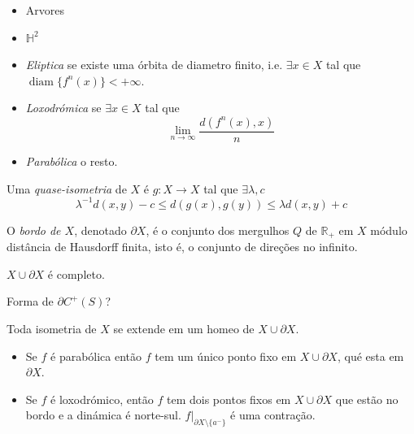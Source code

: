 \medskip{}

\begin{example}
\label{example-gh-hyperbolic}
\begin{itemize}
\item Arvores
\item $\mathbb{H}^2$
\end{itemize}
\end{example}

\medskip{}
\begin{itemize}
\item \textit{Eliptica} se existe uma órbita
de diametro finito, i.e. $\exists x \in X$
tal que
$\operatorname{diam}\{f^n(x)\}<+\infty$.
\item \textit{Loxodrómica} se
$\exists x \in X$ tal que
$$
\lim_{n \to \infty}
\frac{d(f^n(x),x)}{n}
$$
\item \textit{Parabólica} o resto.
\end{itemize}

\begin{definition}
\label{definition-gh-quasi-isometry}
Uma \textit{quase-isometria} de $X$ é
$g:X\to X$ tal que $\exists \lambda,c$
$$
\lambda^{-1}d(x,y)-c\leq d(g(x),g(y))
\leq \lambda d(x,y)+c
$$
\end{definition}

\medskip{}

\begin{definition}
\label{definition-gh-boundary}
O \textit{bordo de $X$}, denotado
$\partial X$, é o conjunto dos mergulhos
$Q$ de $\mathbb{R}_+$ em $X$ módulo
distância de Hausdorff finita, isto é, o
conjunto de direções no infinito.
\end{definition}

\begin{proposition}
\label{proposition-gh-complete}
$X\cup  \partial X$ é completo.
\end{proposition}

\medskip{}
Forma de $\partial C^+(S)$?

\begin{remark}
\label{remark-gh-extends}
Toda isometria de $X$ se extende em um
homeo de $X\cup \partial X$.
\end{remark}

\begin{theorem}[Gromov]
\label{theorem-gh-gromov}
\begin{itemize}
\item Se $f$ é parabólica então $f$ tem um
único ponto fixo em $X\cup \partial X$, qué
esta em $\partial X$.

\item Se $f$ é loxodrómico, então $f$ tem
dois pontos fixos em $X \cup \partial X$ que
estão no bordo e a dinámica é norte-sul.
$f\Big|_{\partial X\setminus \{a^-\}}$ é
uma contração.
\end{itemize}
\end{theorem}

